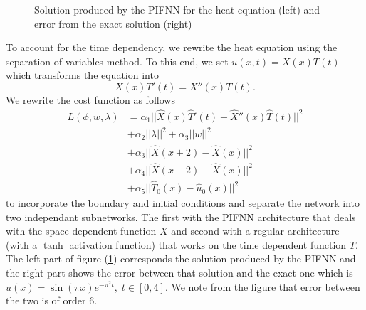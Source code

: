\documentclass[AMS,STIX1COL]{WileyNJD-v2}
\begin{document}
 \begin{figure}[!htb]
    \centering
    \caption{\;Solution produced by the PIFNN for the heat equation (left) and error from the exact solution (right) }
    \label{fig:fnnvsexactheat}
\end{figure}
To account for the time dependency, we rewrite the heat equation using the separation of variables method. To this end, we set $u(x,t) = X(x)T(t)$ which transforms the equation into 
$$X(x)T'(t) = X''(x)T(t).$$
We rewrite the cost function as follows 
\begin{align*}
    L(\phi, w, \lambda) &= \alpha_1||\hat{X}(x)\hat{T}'(t)-\hat{X}''(x)\hat{T}(t)||^2  \\ &+\alpha_2||\lambda||^2 + \alpha_3||w||^2 \\ 
    &+\alpha_3 ||\hat{X}(x + 2) - \hat{X}(x)||^2 \\
    &+\alpha_4||\hat{X}(x - 2) - \hat{X}(x)||^2  \\
   &+ \alpha_5||\hat{T}_0(x) - \hat{u}_0(x)||^2
\end{align*}
to incorporate the boundary and initial conditions and separate the network into two independant subnetworks. The first with the PIFNN architecture that deals with the space dependent function $X$ and second with a regular architecture (with a $\tanh$ activation function) that works on the time dependent function $T$. The left part of figure (\ref{fig:fnnvsexactheat}) corresponds the solution produced by the PIFNN and the right part shows the error between that solution and the exact one which is $u(x) = \sin(\pi x)e^{-\pi^2 t}, \; t \in [0,4]$. We note from the figure that error between the two is of order $6$. \\
\end{document}
